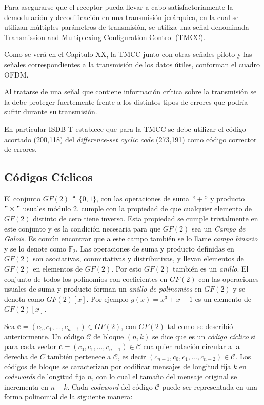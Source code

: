 Para asegurarse que el receptor pueda llevar a cabo satisfactoriamente la demodulación y decodificación en una transmisión jerárquica, en la cual se utilizan múltiples parámetros de transmisión, se utiliza una señal denominada Transmission and Multiplexing Configuration Control (TMCC).

Como se verá en el Capítulo XX, la TMCC junto con otras señales piloto y las señales correspondientes a la transmisión de los datos útiles, conforman el cuadro OFDM.

Al tratarse de una señal que contiene información crítica sobre la transmisión se la debe proteger fuertemente frente a los distintos tipos de errores que podría sufrir durante su transmisión.

En particular ISDB-T establece que para la TMCC se debe utilizar el código acortado (200,118) del \textit{difference-set cyclic code} (273,191) como código corrector de errores.

\subsection{Códigos Cíclicos}
El conjunto $GF(2) \triangleq \{0,1\}$, con las operaciones de suma $" + "$ y producto $" \times "$ usuales módulo 2, cumple con la propiedad de que cualquier elemento de $GF(2)$ distinto de cero tiene inverso. Esta propiedad se cumple trivialmente en este conjunto y es la condición necesaria para que $GF(2)$ sea un \textit{Campo de Galois}. Es común encontrar que a este campo también se lo llame \textit{campo binario} y se lo denote como $\mathbb {F}_2$.
Las operaciones de suma y producto definidas en $GF(2)$ son asociativas, conmutativas y distributivas, y llevan elementos de $GF(2)$ en elementos de $GF(2)$. Por esto $GF(2)$ también es un \textit{anillo}. 
El conjunto de todos los polinomios con coeficientes en $GF(2)$ con las operaciones usuales de suma y producto forman un \textit{anillo de polinomios} en $GF(2)$ y se denota como $GF(2)[x]$. Por ejemplo $g(x) = x^3 + x + 1$ es un elemento de $GF(2)[x]$.

Sea $\textbf{c} = (c_0, c_1, ..., c_{n-1}) \in GF(2)$, con $GF(2)$ tal como se describió anteriormente. Un código $\mathcal{C}$ de bloque $(n, k)$ se dice que es un \textit{código cíclico} si para cada vector $\textbf{c} = (c_0, c_1, ..., c_{n-1}) \in \mathcal{C}$ cualquier rotación circular a la derecha de $C$ también pertenece a $\mathcal{C}$, es decir $(c_{n-1}, c_0, c_1, ..., c_{n-2}) \in \mathcal{C}$.
Los códigos de bloque se caracterizan por codificar mensajes de longitud fija $k$ en \textit{codewords} de longitud fija $n$, con lo cual el tamaño del mensaje original se incrementa en $n-k$.
Cada \textit{codeword} del código $\mathcal{C}$ puede ser representada en una forma polinomial de la siguiente manera:

